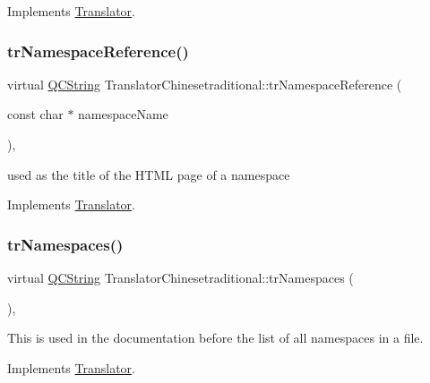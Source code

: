 Implements \mbox{\hyperlink{class_translator}{Translator}}.

\mbox{\label{class_translator_chinesetraditional_ad795887762606aeb8f2103205c4dbee7}} 
\subsubsection{\texorpdfstring{trNamespaceReference()}{trNamespaceReference()}}
{\footnotesize\ttfamily virtual \mbox{\hyperlink{class_q_c_string}{Q\+C\+String}} Translator\+Chinesetraditional\+::tr\+Namespace\+Reference (\begin{DoxyParamCaption}\item[{const char $\ast$}]{namespace\+Name }\end{DoxyParamCaption})\hspace{0.3cm}{\ttfamily [inline]}, {\ttfamily [virtual]}}

used as the title of the H\+T\+ML page of a namespace 

Implements \mbox{\hyperlink{class_translator}{Translator}}.

\mbox{\label{class_translator_chinesetraditional_abbf6cde3ca2bb82a800469df5956a5fb}} 
\subsubsection{\texorpdfstring{trNamespaces()}{trNamespaces()}}
{\footnotesize\ttfamily virtual \mbox{\hyperlink{class_q_c_string}{Q\+C\+String}} Translator\+Chinesetraditional\+::tr\+Namespaces (\begin{DoxyParamCaption}{ }\end{DoxyParamCaption})\hspace{0.3cm}{\ttfamily [inline]}, {\ttfamily [virtual]}}

This is used in the documentation before the list of all namespaces in a file. 

Implements \mbox{\hyperlink{class_translator}{Translator}}.

